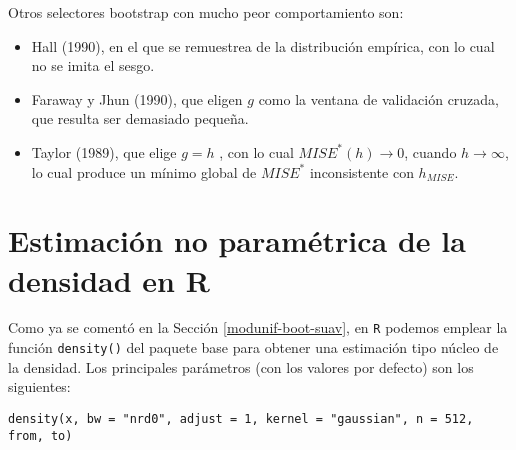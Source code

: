 \documentclass[]{book}
\theoremstyle{break}
\theoremstyle{definition}
\theoremstyle{definition}
\theoremstyle{definition}
\theoremstyle{remark}
\begin{document}
Otros selectores bootstrap con mucho peor comportamiento son:

\begin{itemize}
\item
  Hall (1990), en el que se remuestrea de la distribución empírica, con
  lo cual no se imita el sesgo.
\item
  Faraway y Jhun (1990), que eligen \(g\) como la ventana de validación
  cruzada, que resulta ser demasiado pequeña.
\item
  Taylor (1989), que elige \(g=h\) , con lo cual
  \(MISE^{\ast}\left( h \right) \rightarrow 0\), cuando
  \(h\rightarrow \infty\), lo cual produce un mínimo global de
  \(MISE^{\ast}\) inconsistente con \(h_{MISE}\).
\end{itemize}

\section{Estimación no paramétrica de la densidad en R}\label{npden-r}

Como ya se comentó en la Sección \ref{modunif-boot-suav}, en \texttt{R}
podemos emplear la función \texttt{density()} del paquete base para
obtener una estimación tipo núcleo de la densidad. Los principales
parámetros (con los valores por defecto) son los siguientes:

\begin{verbatim}
density(x, bw = "nrd0", adjust = 1, kernel = "gaussian", n = 512, from, to)
\end{verbatim}
\end{document}
